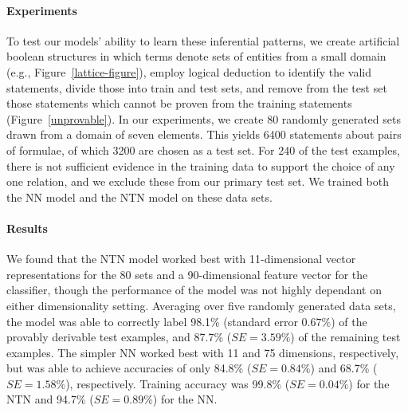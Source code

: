 \documentclass[letterpaper]{article}
\begin{document}
\paragraph{Experiments}
To test our models' ability to learn these inferential patterns, we
create artificial boolean structures in which terms denote sets of entities from
a small domain (e.g., Figure~\ref{lattice-figure}), employ logical
deduction to identify the valid statements, divide those into train
and test sets, and remove from the test set those statements which
cannot be proven from the training statements
(Figure~\ref{unprovable}). 
%
%
%
In our experiments, we create 80 randomly generated sets drawn from a
domain of seven elements. This yields 6400 statements about pairs of
formulae, of which 3200 are chosen as a test set. For 240 of the test examples, 
there is not sufficient evidence in the training data to support the choice of any 
one relation, and we  exclude these from our primary test set. 
We trained both the NN model and the 
NTN model on these data sets. 

\paragraph{Results} 
We found that the NTN model worked best with 11-dimensional vector
representations for the 80 sets and a 90-dimensional feature vector
for the classifier, though the performance of the model was not highly
dependant on either dimensionality setting. 
Averaging over five randomly generated data sets, the model was able to correctly label 98.1\% (standard error $0.67\%$) of the provably derivable test examples, and 87.7\%
($\textit{SE} = 3.59\%$) of the remaining test examples. The simpler NN worked
best with 11 and 75 dimensions, respectively, but was able to achieve
accuracies of only 84.8\% ($\textit{SE} = 0.84\%$) and 68.7\% ($\textit{SE} = 1.58\%$),
respectively. Training accuracy was 99.8\% ($\textit{SE} = 0.04\%$) for the NTN and 94.7\% ($\textit{SE} = 0.89\%$) for
the NN.
\end{document}
